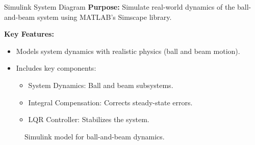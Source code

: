 \documentclass{beamer}
\begin{document}
\begin{frame}{Simulink System Diagram}
    \textbf{Purpose:} Simulate real-world dynamics of the ball-and-beam system using MATLAB's Simscape library.

    \vspace{0.3cm}
    \textbf{Key Features:}
    \begin{itemize}
        \small
        \item Models system dynamics with realistic physics (ball and beam motion).
        \item Includes key components:
        \begin{itemize}
            \footnotesize
            \item System Dynamics: Ball and beam subsystems.
            \item Integral Compensation: Corrects steady-state errors.
            \item LQR Controller: Stabilizes the system.
        \end{itemize}
    \end{itemize}

    \vspace{0.3cm}
    \centering
    \begin{figure}
        \caption{\footnotesize Simulink model for ball-and-beam dynamics.}
        \label{fig:simulink_model}
    \end{figure}
\end{frame}
\end{document}
